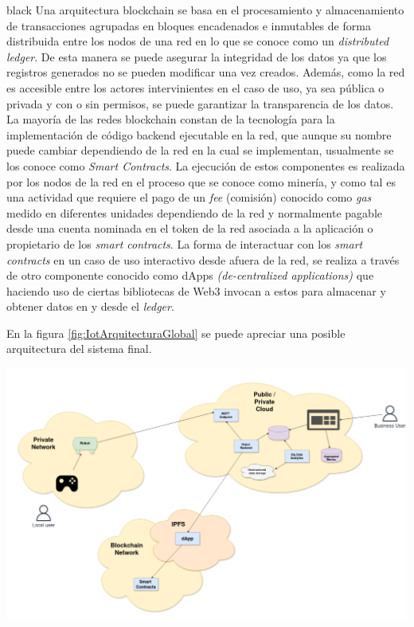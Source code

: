 \documentclass[
11pt, %
]{charter}
\begin{document}
\begin{consigna}{black}
Una arquitectura blockchain se basa en el procesamiento y almacenamiento de transacciones agrupadas en bloques encadenados e inmutables de forma distribuida entre los nodos de una red en lo que se conoce como un \textit{distributed ledger}. De esta manera se puede asegurar la integridad de los datos ya que los registros generados no se pueden modificar una vez creados. Además, como la red es accesible entre los actores intervinientes en el caso de uso, ya sea pública o privada y con o sin permisos, se puede garantizar la transparencia de los datos.
La mayoría de las redes blockchain constan de la tecnología para la implementación de código backend ejecutable en la red, que aunque su nombre puede cambiar dependiendo de la red en la cual se implementan, usualmente se los conoce como \textit{Smart Contracts}. La ejecución de estos componentes es realizada por los nodos de la red en el proceso que se conoce como minería, y como tal es una actividad que requiere el pago de un \textit{fee} (comisión) conocido como \textit{gas} medido en diferentes unidades dependiendo de la red y normalmente pagable desde una cuenta nominada en el token de la red asociada a la aplicación o propietario de los \textit{smart contracts}.
La  forma de interactuar con los \textit{smart contracts} en un caso de uso interactivo desde afuera de la red, se realiza a través de otro componente conocido como dApps \textit{(de-centralized applications)} que haciendo uso de ciertas bibliotecas de Web3 invocan a estos para almacenar y obtener datos en y desde el \textit{ledger}.

En la figura \ref{fig:IotArquitecturaGlobal} se puede apreciar una posible arquitectura del sistema final.

\begin{center}
 \includegraphics[scale=0.15]{Figuras/IoTProject-Page-1.drawio}
 \label{fig:IotArquitecturaGlobal}
\end{center}



\end{consigna}
\end{document}
